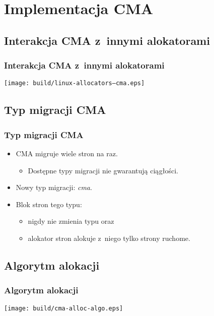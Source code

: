 \section{Implementacja CMA}

\subsection{Interakcja CMA z~innymi alokatorami}

\begin{frame}[fragile]
  \frametitle{Interakcja CMA z~innymi alokatorami}

  \begin{center}
    \texttt{[image: build/linux-allocators--cma.eps]}
  \end{center}
\end{frame}

\subsection{Typ migracji CMA}

\begin{frame}
  \frametitle{Typ migracji CMA}

  \begin{itemize}
  \item CMA migruje wiele stron na raz.
    \begin{itemize}
    \item Dostępne typy migracji nie gwarantują ciągłości.
    \end{itemize}
  \item Nowy typ migracji: \textit{cma}.
  \item Blok stron tego typu:
    \begin{itemize}
    \item nigdy nie zmienia typu oraz
    \item alokator stron alokuje z~niego tylko strony ruchome.
    \end{itemize}
  \end{itemize}
\end{frame}

\subsection{Algorytm alokacji}

\begin{frame}
  \frametitle{Algorytm alokacji}

  \begin{center}
    \texttt{[image: build/cma-alloc-algo.eps]}
  \end{center}

\end{frame}


